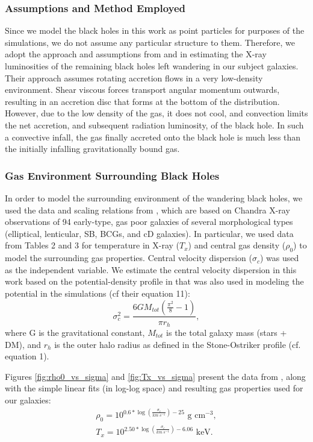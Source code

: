 \documentclass[fleqn,usenatbib,useAMS]{mnras}
\begin{document}
\subsubsection{Assumptions and Method Employed}
Since we model the black holes in this work as point particles for purposes of the simulations, we do not assume any particular structure to them.  Therefore, we adopt the approach and assumptions from \citealt{2018MNRAS.476.1412I} and \citealt{2019MNRAS.486.5377I} in estimating the X-ray luminosities of the remaining black holes left wandering in our subject galaxies.  Their approach assumes rotating accretion flows in a very low-density environment.  Shear viscous forces transport angular momentum outwards, resulting in an accretion disc that forms at the bottom of the distribution.  However, due to the low density of the gas, it does not cool, and convection limits the net accretion, and subsequent radiation luminosity, of the black hole.  In such a convective infall, the gas finally accreted onto the black hole is much less than the initially infalling gravitationally bound gas.

\subsubsection{Gas Environment Surrounding Black Holes}
In order to model the surrounding environment of the wandering black holes, we used the data and scaling relations from \citet{2018ApJ...857...32B}, which are based on Chandra X-ray observations of 94 early-type, gas poor galaxies of several morphological types (elliptical, lenticular, SB, BCGs, and cD galaxies).  In particular, we used data from Tables 2 and 3 for temperature in X-ray ($T_x$) and central gas density ($\rho_0$) to model the surrounding gas properties.  Central velocity dispersion ($\sigma_c$) was used as the independent variable.  We estimate the central velocity dispersion in this work based on the potential-density profile in  \citet{2015ApJ...806L..28S} that was also used in modeling the potential in the simulations (cf their equation 11):
\begin{equation}
    \sigma_c^2 = \frac{6GM_{tot}(\frac{\pi^2}{8}-1)}{{\pi}r_h},
\end{equation}
where G is the gravitational constant, $M_{tot}$ is the total galaxy mass (stars + DM), and $r_h$ is the outer halo radius as defined in the Stone-Ostriker profile (cf. equation 1).

Figures \ref{fig:rho0_vs_sigma} and \ref{fig:Tx_vs_sigma} present the data from \citet{2018ApJ...857...32B}, along with the simple linear fits (in log-log space) and resulting gas properties used for our galaxies:
\begin{subequations} \label{eq:gas_properties}
\begin{eqnarray}
    \rho_0 = 10^{0.6*\log\left(\frac{\sigma_c}{km\ s^{-1}}\right) - 25} \text{  g cm}^{-3},\\
    T_x = 10^{2.50*\log\left(\frac{\sigma_c}{km\ s^{-1}}\right) - 6.06} \text{  keV}.
\end{eqnarray}
\end{subequations}
\end{document}
